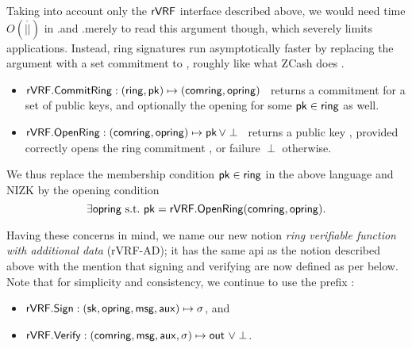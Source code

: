 
Taking into account only the ${\mathsf{rVRF}}$ interface described above, we would need time $O(|\ring|)$ in \rVRF.\rSign and \rVRF.\rVerify merely to read
this \ring argument though, which severely limits applications.  Instead,
ring signatures run asymptotically faster by replacing the \ring argument
with a set commitment to \ring, roughly like what ZCash does \cite{zcash_protocol}.
\begin{itemize}
\item ${\mathsf{rVRF}}.{\mathsf{CommitRing}} : (\mathsf{ring},\mathsf{pk}) \mapsto (\mathsf{comring},\mathsf{opring})$ \,
    returns a commitment for a set \ring of public keys, and
    optionally the opening \openring for some $\mathsf{pk} \in \mathsf{ring}$ as well.
\item ${\mathsf{rVRF}}.{\mathsf{OpenRing}} : (\mathsf{comring},\mathsf{opring}) \mapsto \mathsf{pk} \, \lor \perp$ \,
    returns a public key \pk, provided \openring correctly opens
    the ring commitment \comring, or failure $\perp$ otherwise.
\end{itemize}

We thus replace the membership condition $\mathsf{pk} \in \mathsf{ring}$ in the above
language and NIZK by the opening condition
$$ \exists \mathsf{opring} \textrm{\ s.t.\ } \mathsf{pk} = {\mathsf{rVRF}}.{\mathsf{OpenRing}}(\mathsf{comring},\mathsf{opring}) . $$
%


Having these concerns in mind, we name our new notion \emph{ring verifiable function with additional data} (rVRF-AD); 
it has the same api as the \rVRF notion described above with the mention that signing and verifying are now defined as per below. Note that for simplicity and consistency,
we continue to use the prefix \rVRF:
\begin{itemize}
\item ${\mathsf{rVRF}}.{\mathsf{Sign}} : (\mathsf{sk},\mathsf{opring},\mathsf{msg},\mathsf{aux}) \mapsto \sigma$, \quad and
\item ${\mathsf{rVRF}}.{\mathsf{Verify}} : (\mathsf{comring},\mathsf{msg},\mathsf{aux},\sigma) \mapsto {\ensuremath{\mathsf{out}}} \,\, \lor \perp$.
\end{itemize}

